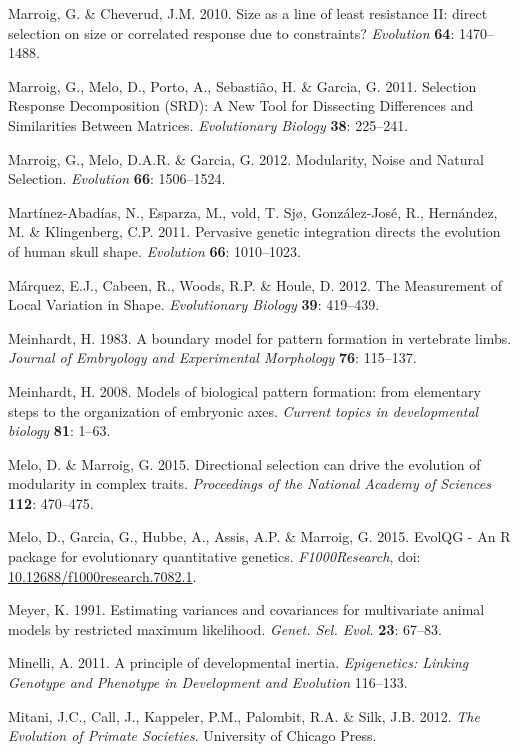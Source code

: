 \documentclass[12pt,twoside]{report}
\begin{document}
Marroig, G. \& Cheverud, J.M. 2010. Size as a line of least resistance
II: direct selection on size or correlated response due to constraints?
\emph{Evolution} \textbf{64}: 1470--1488.

Marroig, G., Melo, D., Porto, A., Sebastião, H. \& Garcia, G. 2011.
Selection Response Decomposition (SRD): A New Tool for Dissecting
Differences and Similarities Between Matrices. \emph{Evolutionary
Biology} \textbf{38}: 225--241.

Marroig, G., Melo, D.A.R. \& Garcia, G. 2012. Modularity, Noise and
Natural Selection. \emph{Evolution} \textbf{66}: 1506--1524.

Martínez-Abadías, N., Esparza, M., vold, T. Sjø, González-José, R.,
Hernández, M. \& Klingenberg, C.P. 2011. Pervasive genetic integration
directs the evolution of human skull shape. \emph{Evolution}
\textbf{66}: 1010--1023.

Márquez, E.J., Cabeen, R., Woods, R.P. \& Houle, D. 2012. The
Measurement of Local Variation in Shape. \emph{Evolutionary Biology}
\textbf{39}: 419--439.

Meinhardt, H. 1983. A boundary model for pattern formation in vertebrate
limbs. \emph{Journal of Embryology and Experimental Morphology}
\textbf{76}: 115--137.

Meinhardt, H. 2008. Models of biological pattern formation: from
elementary steps to the organization of embryonic axes. \emph{Current
topics in developmental biology} \textbf{81}: 1--63.

Melo, D. \& Marroig, G. 2015. Directional selection can drive the
evolution of modularity in complex traits. \emph{Proceedings of the
National Academy of Sciences} \textbf{112}: 470--475.

Melo, D., Garcia, G., Hubbe, A., Assis, A.P. \& Marroig, G. 2015. EvolQG
- An R package for evolutionary quantitative genetics.
\emph{F1000Research}, doi:
\href{http://dx.doi.org/10.12688/f1000research.7082.1}{10.12688/f1000research.7082.1}.

Meyer, K. 1991. Estimating variances and covariances for multivariate
animal models by restricted maximum likelihood. \emph{Genet. Sel. Evol.}
\textbf{23}: 67--83.

Minelli, A. 2011. A principle of developmental inertia.
\emph{Epigenetics: Linking Genotype and Phenotype in Development and
Evolution} 116--133.

Mitani, J.C., Call, J., Kappeler, P.M., Palombit, R.A. \& Silk, J.B.
2012. \emph{The Evolution of Primate Societies}. University of Chicago
Press.
\end{document}

